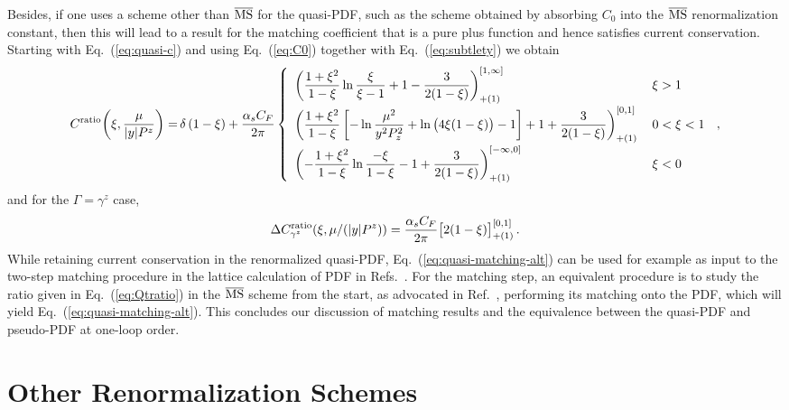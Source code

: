 \documentclass[prd,aps,twocolumn,preprintnumbers,showpacs,nofootinbib,superscriptaddress,notitlepage]{revtex4-1}
\newcommand{\beq}{\begin{eqnarray}}
\newcommand{\eeq}{\end{eqnarray}}
\newcommand{\nn}{\nonumber}
\DeclareRobustCommand{\eq}[1]{Eq.~(\ref{eq:#1})}
\begin{document}
\begin{widetext}
Besides, if one uses a scheme other than $\overline{\rm MS}$ for the quasi-PDF, such as the scheme obtained by absorbing $C_0$ into the $\overline{\rm MS}$ renormalization constant, then this will lead to a result for the matching coefficient that is a pure plus function and hence satisfies current conservation. Starting with \eq{quasi-c} and using \eq{C0} together with \eq{subtlety} we obtain
\begin{align} \label{eq:quasi-matching-alt}
C^{\rm ratio\!}\left(\xi, {\mu\over |y| P^z}\right)
= &\, \delta\left(1-\xi\right)+{\alpha_sC_F\over 2\pi}\left\{
\begin{array}{ll}
\displaystyle \left({1+\xi^2\over 1-\xi}\ln {\xi\over \xi-1} + 1 - {3\over 2(1-\xi)}\right)^{[1,\infty]}_{+(1)}
&\, \xi>1
\nn\\[10pt]
\displaystyle \left({1+\xi^2\over 1-\xi}\left[
- \ln{\mu^2\over y^2P_z^2} + \ln\big(4\xi(1-\xi)\big)-1\right] +1+ {3\over 2(1-\xi)}\right)^{[0,1]}_{+(1)}
&\, 0<\xi<1
\nn\\[10pt]
\displaystyle  \left(-{1+\xi^2\over 1-\xi}\ln {-\xi\over 1-\xi} - 1 + {3\over 2(1-\xi)}\right)^{[-\infty,0]}_{+(1)}\quad
&\, \xi<0
\end{array}\right.\,,\nn\\
\end{align}
and for the $\Gamma=\gamma^z$ case,
\beq
\Delta C^{\rm ratio}_{\gamma^z}(\xi, \mu/(|y| P^z))  = {\alpha_s C_F\over 2\pi} \big[2(1-\xi)\big]^{[0,1]}_{+(1)} \,.
\eeq
While retaining current conservation in the renormalized quasi-PDF, \eq{quasi-matching-alt} can be used for example as input to the two-step matching procedure in the lattice calculation of PDF in Refs.~\cite{Alexandrou:2017huk}. 
For the matching step, an equivalent procedure is to study the ratio given in \eq{Qtratio} in the $\overline{\rm MS}$ scheme from the start, as advocated in Ref.~\cite{Radyushkin:2017cyf,Radyushkin:2017lvu}, performing its matching onto the PDF, which will yield \eq{quasi-matching-alt}. This concludes our discussion of matching results and the equivalence between the quasi-PDF and pseudo-PDF at one-loop order.
	
\end{widetext}


\section{Other Renormalization Schemes}
\label{sec:ren}
\end{document}
